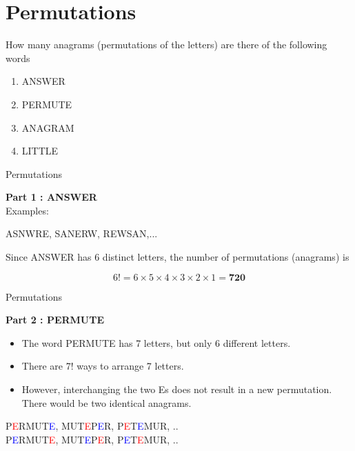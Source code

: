 



\newpage
\chapter{Permutations}


How many anagrams (permutations of the letters) are there of the following words
\begin{enumerate}
\item ANSWER
\item PERMUTE
\item ANAGRAM
\item LITTLE
\end{enumerate}




{Permutations}

\textbf{Part 1 : ANSWER}\\
Examples:
\begin{center}
ASNWRE,\;
SANERW,\;
REWSAN,\;...
\end{center}

Since ANSWER has 6 distinct letters, the number of permutations (anagrams) is

\[6! = 6\times 5 \times 4 \times 3 \times 2\times 1 = \boldsymbol{720} \]


{Permutations}

\textbf{Part 2 : PERMUTE}\\
\begin{itemize}
\item The word PERMUTE has 7 letters, but only 6 different letters. 
\item There are 7! ways to arrange 7 letters.
\item However, interchanging the two Es does not result in a new permutation. There would be two identical anagrams.
\end{itemize}

\begin{center}
P\textcolor{red}{E}RMUT\textcolor{blue}{E}, \; MUT\textcolor{red}{E}P\textcolor{blue}{E}R, \; P\textcolor{red}{E}T\textcolor{blue}{E}MUR,\; ..\\
P\textcolor{blue}{E}RMUT\textcolor{red}{E}, \; MUT\textcolor{blue}{E}P\textcolor{red}{E}R, \; P\textcolor{blue}{E}T\textcolor{red}{E}MUR,\; ..
\end{center}

